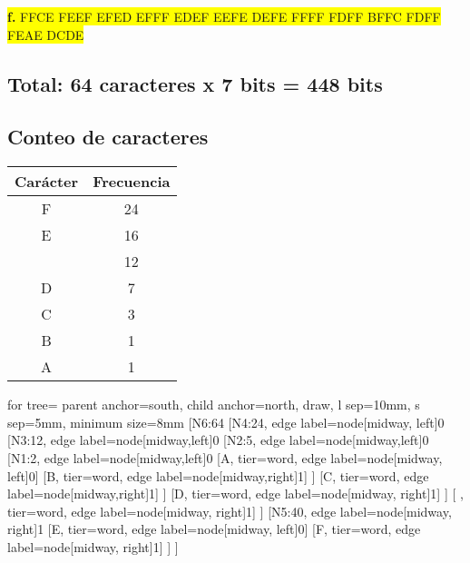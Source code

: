 \documentclass{article}
\begin{document}
	\vspace{0.5cm}
	\begin{center}
		\hspace{3cm}\colorbox{yellow}{{\textbf{f.} FFCE FEEF EFED EFFF EDEF EEFE DEFE FFFF FDFF BFFC FDFF FEAE DCDE}}\newline
		\subsection*{Total: 64 caracteres x 7 bits = 448 bits}
		\vspace{0.5cm}
		\subsection*{Conteo de caracteres}
		\begin{tabular}{c|c}
			\textbf{Carácter} & \textbf{Frecuencia} \\
			\hline
			F & 24 \\
			E & 16 \\
			  & 12 \\
			D & 7 \\
			C & 3 \\
			B & 1 \\
			A & 1 \\  
		\end{tabular}
		
		\vspace{1cm}
		
		\begin{forest}
			for tree={
				parent anchor=south,
				child anchor=north,
				draw,
				l sep=10mm,
				s sep=5mm,
				minimum size=8mm
			}
			[N6:64
			[N4:24, edge label={node[midway, left]{0}}
				[N3:12, edge label={node[midway,left]{0}}
					[N2:5, edge label={node[midway,left]{0}}
						[N1:2, edge label={node[midway,left]{0}}
							[A, tier=word, edge label={node[midway, left]{0}}]
							[B, tier=word, edge label={node[midway,right]{1}}]
						]
					[C, tier=word, edge label={node[midway,right]{1}}]	
					]
					[D, tier=word, edge label={node[midway, right]{1}}]	
				]
				[ , tier=word, edge label={node[midway, right]{1}}]
			]	
			[N5:40, edge label={node[midway, right]{1}}
				[E, tier=word, edge label={node[midway, left]{0}}]
				[F, tier=word, edge label={node[midway, right]{1}}]
			]
			]
		\end{forest}
		
		

\end{center}
\end{document}
